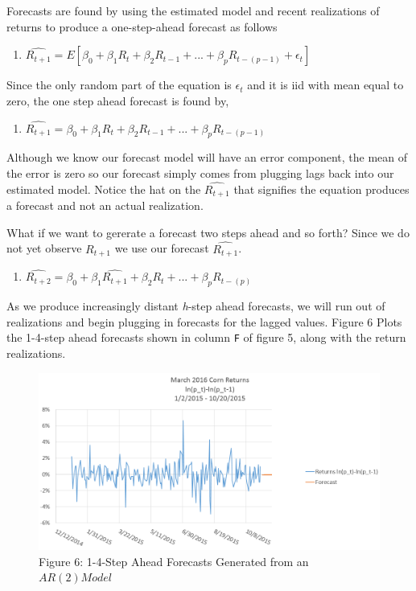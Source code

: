 \documentclass[]{book}
\providecommand{\tightlist}{%
  \setlength{\itemsep}{0pt}\setlength{\parskip}{0pt}}
\theoremstyle{definition}
\theoremstyle{definition}
\theoremstyle{remark}
\begin{document}
Forecasts are found by using the estimated model and recent realizations
of returns to produce a one-step-ahead forecast as follows

\begin{enumerate}
\def\labelenumi{\arabic{enumi}.}
\setcounter{enumi}{2}
\tightlist
\item
  \(\hat{R_{t+1}} = E[\beta_0 + \beta_1R_{t} + \beta_2R_{t-1}+ ... + \beta_{p}R_{t-(p-1)} + \epsilon_t]\)
\end{enumerate}

Since the only random part of the equation is \(\epsilon_t\) and it is
iid with mean equal to zero, the one step ahead forecast is found by,

\begin{enumerate}
\def\labelenumi{\arabic{enumi}.}
\setcounter{enumi}{3}
\tightlist
\item
  \(\hat{R_{t+1}} = \beta_0 + \beta_1R_{t} + \beta_2R_{t-1}+ ... + \beta_{p}R_{t-(p-1)}\)
\end{enumerate}

Although we know our forecast model will have an error component, the
mean of the error is zero so our forecast simply comes from plugging
lags back into our estimated model. Notice the hat on the
\(\hat{R_{t+1}}\) that signifies the equation produces a forecast and
not an actual realization.

What if we want to gererate a forecast two steps ahead and so forth?
Since we do not yet observe \(R_{t+1}\) we use our forecast
\(\hat{R_{t+1}}\).

\begin{enumerate}
\def\labelenumi{\arabic{enumi}.}
\setcounter{enumi}{4}
\tightlist
\item
  \(\hat{R_{t+2}} = \beta_0 + \beta_1\hat{R_{t+1}} + \beta_2R_{t}+ ... + \beta_{p}R_{t-(p)}\)
\end{enumerate}

As we produce increasingly distant \emph{h}-step ahead forecasts, we
will run out of realizations and begin plugging in forecasts for the
lagged values. Figure 6 Plots the 1-4-step ahead forecasts shown in
column \texttt{F} of figure 5, along with the return realizations.

\begin{figure}[htbp]
\centering
\includegraphics{images/12_forecast_plot.png}
\caption{Figure 6: 1-4-Step Ahead Forecasts Generated from an
\(AR(2) Model\)}
\end{figure}
\end{document}
